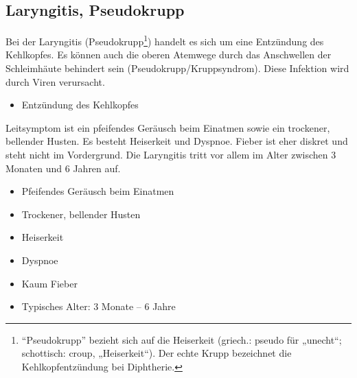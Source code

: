 \subsection{Laryngitis, Pseudokrupp}
\label{topic:laryngitis}
\label{topic:pseudokrupp}


{%
Bei der Laryngitis
(Pseudokrupp\footnote{\enquote{Pseudokrupp}
bezieht sich auf die Heiserkeit (griech.: pseudo für
„unecht“; schottisch: croup,
„Heiserkeit“\cite{wiki:pseudokrupp}). Der echte Krupp
bezeichnet die Kehlkopfentzündung bei Diphtherie.}) handelt
es sich um eine Entzündung des Kehlkopfes. Es können auch die
oberen Atemwege durch das Anschwellen der Schleimhäute
behindert sein (Pseudokrupp/Kruppsyndrom). Diese Infektion
wird durch Viren verursacht. 
}{
\begin{itemize}
  \item Entzündung des Kehlkopfes
\end{itemize}
}{}{}{}


{%
Leitsymptom ist ein pfeifendes Geräusch beim Einatmen
 sowie ein trockener, bellender
Husten. Es besteht Heiserkeit und Dyspnoe. Fieber ist eher
diskret und steht nicht im Vordergrund. Die Laryngitis tritt
vor allem im Alter zwischen 3 Monaten und 6 Jahren auf.


}{
\begin{itemize}
    \item Pfeifendes Geräusch beim Einatmen
    \item Trockener, bellender Husten
    \item Heiserkeit
    \item Dyspnoe
    \item Kaum Fieber
    \item Typisches Alter: 3 Monate -- 6 Jahre
\end{itemize}
}{}{}{}



% 


